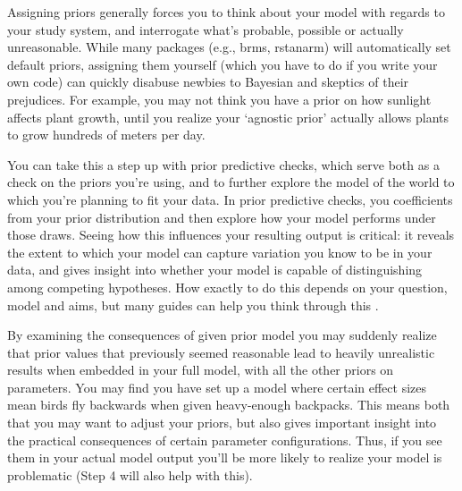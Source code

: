 \documentclass[11pt]{article}
\begin{document}
{Assigning priors generally forces you to think about your model with regards to your study system, and interrogate what's probable, possible or actually unreasonable. While many packages (e.g., \textsf{brms, rstanarm}) will automatically set default priors, assigning them yourself (which you have to do if you write your own code) can quickly disabuse newbies to Bayesian and skeptics of their prejudices. For example, you may not think you have a prior on how sunlight affects plant growth, until you realize your `agnostic prior' actually allows plants to grow hundreds of meters per day. %

You can take this a step up with prior predictive checks, which serve both as a check on the priors you're using, and to further explore the model of the world to which you're planning to fit your data. In prior predictive checks, you coefficients from your prior distribution and then explore how your model performs under those draws. Seeing how this influences your resulting output is critical: it reveals the extent to which your model can capture variation you know to be in your data, and gives insight into whether your model is capable of distinguishing among competing hypotheses. How exactly to do this depends on your question, model and aims, but many guides can help you think through this \citep{betanprior,wesner2021,winter2023}. 

By examining the consequences of given prior model you may suddenly realize that prior values that previously seemed reasonable lead to heavily unrealistic results when embedded in your full model, with all the other priors on parameters. You may find you have set up a model where certain effect sizes mean birds fly backwards when given heavy-enough backpacks. This means both that you may want to adjust your priors, but also gives important insight into the practical
consequences of certain parameter configurations. Thus, if you see them in your actual model output you'll be more likely to realize your model is problematic (Step 4 will also help with this).

}
\end{document}
